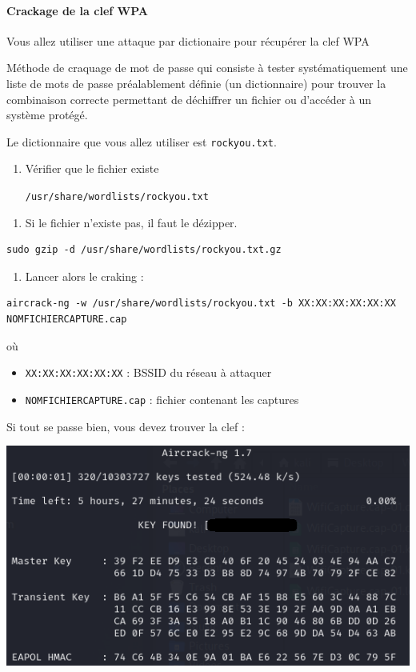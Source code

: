 \documentclass[french, 12pt]{article}%
\newcommand{\itemE}{\item[$\bullet$]}
\newcommand{\titreencadre}{Titre}
\newenvironment{encadre}[1]{\renewcommand{\titreencadre}{#1}
	\begin{mdframed}[style=encadrestyle]
	\vspace{0.5\baselineskip}
	}{%
	\end{mdframed}}
\begin{document}
\paragraph{Crackage de la clef WPA}
Vous allez utiliser une attaque par dictionaire pour récupérer la clef WPA

\begin{encadre}{Attaque par dictionnaire}
Méthode de craquage de mot de passe qui consiste à tester systématiquement une liste de mots de passe préalablement définie (un dictionnaire) pour trouver la combinaison correcte permettant de déchiffrer un fichier ou d'accéder à un système protégé.
\end{encadre}

Le dictionnaire que vous allez utiliser est \verb?rockyou.txt?.


\begin{enumerate}[resume]
\item Vérifier que le fichier existe 

\verb?/usr/share/wordlists/rockyou.txt?
\end{enumerate}


\begin{enumerate}[resume]
\item Si le fichier n'existe pas, il faut le dézipper.
\end{enumerate}

\begin{lstlisting}[style=commande]
sudo gzip -d /usr/share/wordlists/rockyou.txt.gz
\end{lstlisting}



\begin{enumerate}[resume]
\item Lancer alors le craking : 
\end{enumerate}
\begin{lstlisting}[style=commande]
aircrack-ng -w /usr/share/wordlists/rockyou.txt -b XX:XX:XX:XX:XX:XX NOMFICHIERCAPTURE.cap
\end{lstlisting}
où 
\begin{itemize}
\itemE \verb?XX:XX:XX:XX:XX:XX? : BSSID du réseau à attaquer
\itemE \verb?NOMFICHIERCAPTURE.cap?  : fichier contenant les captures
\end{itemize}

Si tout se passe bien, vous devez trouver la clef : 
\begin{center}
\includegraphics[scale=0.7]{./ressource/clefTrouvee}
\end{center}
\end{document}
